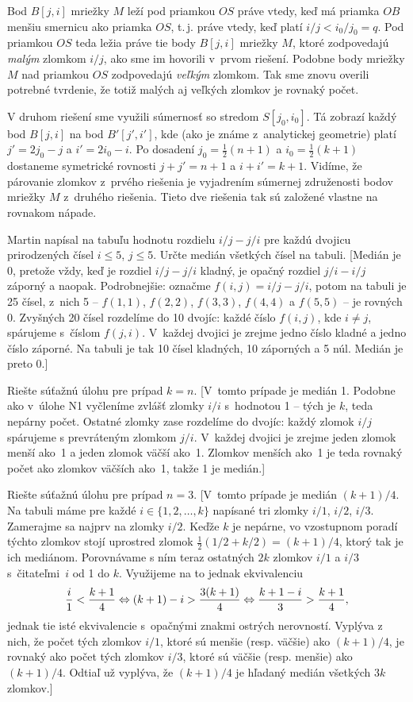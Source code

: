 {Bod $B[j,i]$ mriežky $M$ leží pod priamkou $OS$ práve vtedy, keď
má priamka $OB$ menšiu smernicu ako priamka $OS$, t.\,j. práve vtedy, keď
platí $i/j<i_0/j_0=q$. Pod priamkou $OS$ teda ležia práve tie body
$B[j,i]$ mriežky $M$, ktoré zodpovedajú {\it malým\/} zlomkom
$i/j$, ako sme im hovorili v~prvom riešení.
Podobne body mriežky $M$
nad priamkou $OS$ zodpovedajú {\it veľkým\/} zlomkom. Tak sme
znovu overili potrebné tvrdenie, že totiž malých aj veľkých zlomkov
je rovnaký počet.

   \Pozn
V druhom riešení sme využili súmernosť so stredom $S[j_0,i_0]$.
Tá zobrazí každý bod $B[j,i]$ na bod $B'[j',i']$, kde (ako je známe
z~analytickej geometrie) platí $j'=2j_0-j$ a $i'=2i_0-i$. Po
dosadení $j_0=\frac12(n+1)$ a $i_0=\frac12(k+1)$ dostaneme
symetrické rovnosti $j+j'=n+1$ a $i+i'=k+1$. Vidíme, že párovanie zlomkov
z~prvého riešenia je vyjadrením súmernej združenosti bodov mriežky
$M$ z~druhého riešenia. Tieto dve riešenia tak sú založené
vlastne na rovnakom nápade.

Martin napísal na tabuľu hodnotu rozdielu $i/j -j/i$
pre každú dvojicu prirodzených čísel $i\leq 5$, $j\leq 5$.
Určte medián všetkých čísel na tabuli.
[Medián je 0, pretože vždy, keď je rozdiel $i/j -j/i$ kladný,
je opačný rozdiel $j/i -i/j$ záporný a naopak.
Podrobnejšie: označme $f(i, j) =i/j -j/i$, potom na tabuli je 25 čísel,
z~nich 5 -- $f(1, 1)$, $f(2, 2)$, $f(3, 3)$, $f(4, 4)$ a $f(5, 5)$ -- je
rovných 0. Zvyšných 20 čísel rozdelíme do 10 dvojíc: každé číslo
$f(i, j)$, kde $i\ne j$, spárujeme s~číslom $f(j, i)$.
V~každej dvojici je zrejme jedno číslo kladné a jedno číslo záporné.
Na tabuli je tak 10 čísel kladných, 10 záporných a 5 núl.
Medián je preto 0.]

Riešte súťažnú úlohu pre prípad $k=n$.
[V~tomto prípade je medián 1. Podobne ako v~úlohe N1
vyčleníme zvlášť zlomky $i/i$ s~hodnotou 1 -- tých je $k$, teda
nepárny počet.
Ostatné zlomky zase rozdelíme do dvojíc:
každý zlomok $i/j$ spárujeme s prevráteným zlomkom $j/i$.
V~každej dvojici je zrejme jeden zlomok menší ako~1 a jeden zlomok väčší
ako~1. Zlomkov menších ako~1 je teda rovnaký počet
ako zlomkov väčších ako~1, takže 1 je medián.]

Riešte súťažnú úlohu pre prípad $n=3$.
[V~tomto prípade je medián $(k+1)/4$. Na tabuli máme
pre každé $i\in\{1,2,\dots,k\}$ napísané tri zlomky $i/1$,
$i/2$, $i/3$. Zamerajme sa najprv na zlomky
$i/2$. Keďže $k$ je nepárne, vo vzostupnom poradí týchto zlomkov
stojí uprostred zlomok $\frac12(1/2+k/2)=(k+1)/4$, ktorý tak je
ich mediánom. Porovnávame s ním teraz ostatných $2k$ zlomkov
$i/1$ a $i/3$ s~čitateľmi~$i$ od 1 do $k$.
Využijeme na to jednak ekvivalenciu
$$\let\ekv=\Leftrightarrow
\frac{i}{1}<\frac{k+1}{4}\ekv(k+1)-i>\frac{3(k+1)}{4}\ekv
\frac{k+1-i}{3}>\frac{k+1}{4},
$$
jednak tie isté ekvivalencie s~opačnými znakmi ostrých nerovností.
Vyplýva z nich, že počet tých zlomkov $i/1$, ktoré sú menšie (resp.
väčšie) ako $(k+1)/4$, je rovnaký ako počet tých zlomkov $i/3$, ktoré sú
väčšie (resp. menšie) ako $(k+1)/4$. Odtiaľ už vyplýva, že $(k+1)/4$
je hľadaný medián všetkých $3k$ zlomkov.]

}
